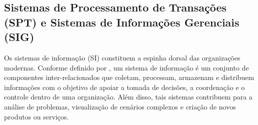 \documentclass[portuguese]{sbc2025}%
\begin{document}




\subsection{Sistemas de Processamento de Transações (SPT) e Sistemas de Informações Gerenciais (SIG)}

Os sistemas de informação (SI) constituem a espinha dorsal das organizações modernas. Conforme definido por \cite{Laudon_Laudon_2011}, um sistema de informação é um conjunto de componentes inter-relacionados que coletam, processam, armazenam e distribuem informações com o objetivo de apoiar a tomada de decisões, a coordenação e o controle dentro de uma organização. Além disso, tais sistemas contribuem para a análise de problemas, visualização de cenários complexos e criação de novos produtos ou serviços.
\end{document}
